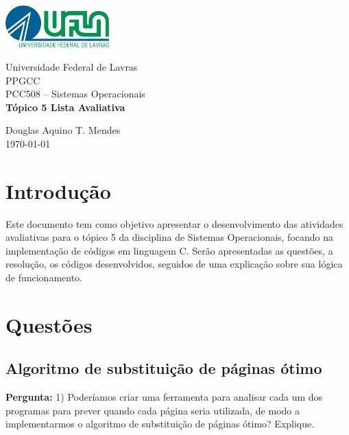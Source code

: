 \documentclass{article}
\begin{document}
\begin{titlepage}
    \centering
    \includegraphics[width=0.3\textwidth]{../../Topic1/Avaliativo/Imagens/Logo UFLA - Colorida chapada.png}

    \vspace*{2cm} %
    \Large
    Universidade Federal de Lavras\\
    PPGCC\\
    PCC508 – Sistemas Operacionais\\
    
    \vspace{2cm} %
    \huge %
    \textbf{Tópico 5 Lista Avaliativa}
    
    \vfill %
    
    \large
    Douglas Aquino T. Mendes\\
    \today %
\end{titlepage}

\tableofcontents
\newpage

\section{Introdução}
Este documento tem como objetivo apresentar o desenvolvimento das atividades avaliativas para o tópico 5 da disciplina de Sistemas Operacionais, focando na implementação de códigos em linguagem C. Serão apresentadas as questões, a resolução, os códigos desenvolvidos, seguidos de uma explicação sobre sua lógica de funcionamento.

\section{Questões}

\subsection{Algoritmo de substituição de páginas ótimo}
\textbf{Pergunta:} 1) Poderíamos criar uma ferramenta para analisar cada um dos programas para prever quando cada página seria utilizada, de modo a  implementarmos o algoritmo de substituição de páginas ótimo? Explique.  \newline
\end{document}
